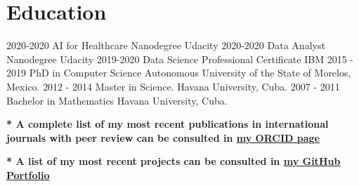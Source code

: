 \documentclass[]{friggeri-cv}
\begin{document}
\section{Education}
\begin{entrylist}\vspace{-.1in}
\entry
    {2020-2020}
    { AI for Healthcare Nanodegree}
    {Udacity}  {}\vspace{-.1in}
    \entry
    {2020-2020}
    { Data Analyst Nanodegree}
    {Udacity}  {}\vspace{-.1in}
\entry
    {2019-2020}
    { Data Science Professional Certificate}
    {IBM}  {}\vspace{-.1in}
\entry  
    {2015 - 2019}
    {PhD in Computer Science}
    {Autonomous University of the State of Morelos, Mexico.}  {}\vspace{-.1in}
  \entry
    {2012 - 2014}
    {Master in Science.}
    {Havana University, Cuba.}{}
  \entry
    {2007 - 2011}
    {Bachelor in Mathematics}
    {Havana University,
    Cuba.}
     {}
\end{entrylist}

\textbf{* A complete list of my most recent publications in international journals with peer review can be  consulted in \href{https://orcid.org/0000-0001-6005-0702/}{my ORCID page}}

\textbf{* A  list of my most recent projects  can be  consulted in  \href{https://claudia-perez-ruisanchez.github.io/portfolio}{my GitHub Portfolio}}
\end{document}

